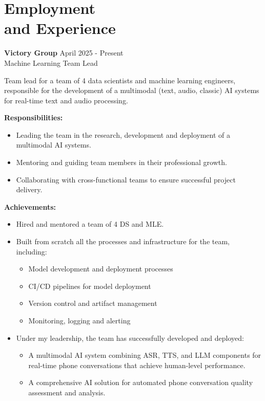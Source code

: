 \section{\sc Employment \\and Experience}
\vspace{2.6pt}

\textbf{Victory Group} \hfill April 2025 - Present \\
Machine Learning Team Lead

Team lead for a team of 4 data scientists and machine learning engineers, responsible for the development of a multimodal (text, audio, classic) AI systems for real-time text and audio processing.

\textbf{Responsibilities:}

\begin{itemize}[left=0pt, label={--}]
    \item Leading the team in the research, development and deployment of a multimodal AI systems.
    \item Mentoring and guiding team members in their professional growth.
    \item Collaborating with cross-functional teams to ensure successful project delivery.
\end{itemize}

\textbf{Achievements:}

\begin{itemize}[left=0pt, label={--}]
    \item Hired and mentored a team of 4 DS and MLE.
    \item Built from scratch all the processes and infrastructure for the team, including:
    \begin{itemize}[topsep=0pt]
        \item Model development and deployment processes
        \item CI/CD pipelines for model deployment
        \item Version control and artifact management
        \item Monitoring, logging and alerting
    \end{itemize}
    \item Under my leadership, the team has successfully developed and deployed:
    \begin{itemize}[topsep=0pt]
        \item A multimodal AI system combining ASR, TTS, and LLM components for real-time phone conversations that achieve human-level performance.
        \item A comprehensive AI solution for automated phone conversation quality assessment and analysis.
    \end{itemize}
\end{itemize}

